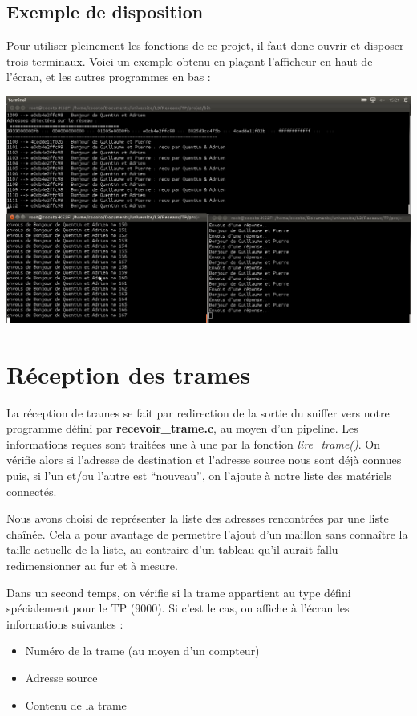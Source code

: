 \documentclass[a4paper,11pt]{article}
\begin{document}
		\subsection{Exemple de disposition}
		Pour utiliser pleinement les fonctions de ce projet, il faut donc ouvrir et disposer trois terminaux. Voici un exemple obtenu en plaçant l'afficheur en haut de l'écran, et les autres programmes en bas :\\
		\begin{center} \includegraphics[width=15cm]{capture_ecran_rapport.png}\label{presentation}\end{center}
	\section{Réception des trames}
	La réception de trames se fait par redirection de la sortie du sniffer vers notre programme défini par \textbf{recevoir\_trame.c}, au moyen d'un pipeline.
	Les informations reçues sont traitées une à une par la fonction \textit{lire\_trame()}. On vérifie alors si l'adresse de destination et l'adresse source nous sont déjà connues puis, si l'un et/ou l'autre est ``nouveau'', on l'ajoute à notre liste des matériels connectés.

	Nous avons choisi de représenter la liste des adresses rencontrées par une liste chaînée. Cela a pour avantage de permettre l'ajout d'un maillon sans connaître la taille actuelle de la liste, au contraire d'un tableau qu'il aurait fallu redimensionner au fur et à mesure.
	
	Dans un second temps, on vérifie si la trame appartient au type défini spécialement pour le TP (9000). Si c'est le cas, on affiche à l'écran les informations suivantes :
	\begin{itemize}
		\item Numéro de la trame (au moyen d'un compteur)
		\item Adresse source
		\item Contenu de la trame
	\end{itemize}
\end{document}
